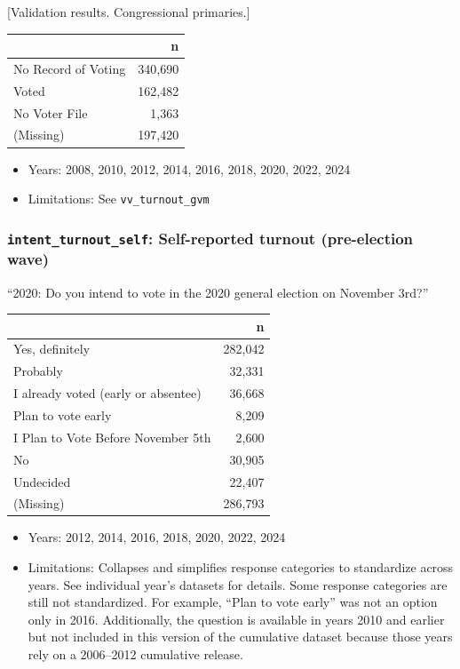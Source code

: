 \documentclass[10pt,article,oneside]{memoir}
\begin{document}
{[}Validation results. Congressional primaries.{]}

\begin{table}[H]
\centering
\begin{tabular}[t]{lr}
\toprule
 & n\\
\midrule
No Record of Voting & 340,690\\
Voted & 162,482\\
No Voter File & 1,363\\
(Missing) & 197,420\\
\bottomrule
\end{tabular}
\end{table}

\begin{itemize}
\tightlist
\item
  Years: 2008, 2010, 2012, 2014, 2016, 2018, 2020, 2022, 2024
\item
  Limitations: See \texttt{vv\_turnout\_gvm}
\end{itemize}

\subsubsection{\texorpdfstring{\texttt{intent\_turnout\_self}:
Self-reported turnout (pre-election
wave)}{intent\_turnout\_self: Self-reported turnout (pre-election wave)}}\label{intent_turnout_self-self-reported-turnout-pre-election-wave}

``2020: Do you intend to vote in the 2020 general election on November
3rd?''

\begin{table}[H]
\centering
\begin{tabular}[t]{lr}
\toprule
 & n\\
\midrule
Yes, definitely & 282,042\\
Probably & 32,331\\
I already voted (early or absentee) & 36,668\\
Plan to vote early & 8,209\\
I Plan to Vote Before November 5th & 2,600\\
No & 30,905\\
Undecided & 22,407\\
(Missing) & 286,793\\
\bottomrule
\end{tabular}
\end{table}

\begin{itemize}
\tightlist
\item
  Years: 2012, 2014, 2016, 2018, 2020, 2022, 2024
\item
  Limitations: Collapses and simplifies response categories to
  standardize across years. See individual year's datasets for details.
  Some response categories are still not standardized. For example,
  ``Plan to vote early'' was not an option only in 2016. Additionally,
  the question is available in years 2010 and earlier but not included
  in this version of the cumulative dataset because those years rely on
  a 2006--2012 cumulative release.
\end{itemize}
\end{document}
